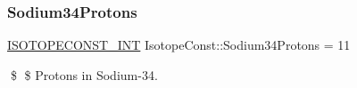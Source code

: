 \subsubsection{\texorpdfstring{Sodium34\+Protons}{Sodium34Protons}}
{\footnotesize\ttfamily \mbox{\hyperlink{group___isotope_const-_macros_ga5f18360b3e99483a35c32d789e62621c}{I\+S\+O\+T\+O\+P\+E\+C\+O\+N\+S\+T\+\_\+\+I\+NT}} Isotope\+Const\+::\+Sodium34\+Protons = 11}

\$ \$ Protons in Sodium-\/34. 